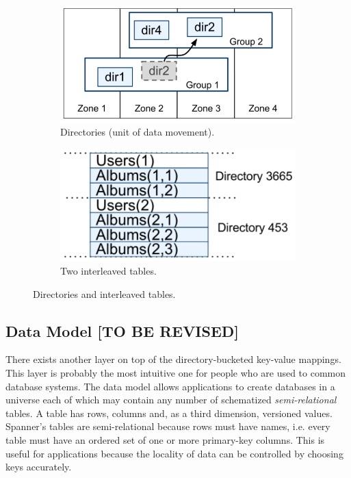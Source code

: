 \documentclass[onecolumn, a4paper, 10pt]{article}
\newcommand{\tbr}{{\color{red}\textbf{[TO BE REVISED]}}}
\begin{document}
\begin{figure}[ht]
  \centering
  \begin{subfigure}{0.45\textwidth}
    \includegraphics[width = \textwidth]{figs/directories}
    \caption{Directories (unit of data movement).~\cite{Corbett:2012}}
    \label{subfig:directories}
  \end{subfigure}
  \qquad
  \begin{subfigure}{0.45\textwidth}
    \includegraphics[width = \textwidth]{figs/interleaving-example.png}
    \caption{Two interleaved tables.~\cite{Corbett:2012}}
    \label{subfig:interleaved-tables}
  \end{subfigure}
  \caption{Directories and interleaved tables.}
  \label{fig:directories-and-tables}
\end{figure}

\subsection{Data Model \tbr}
\label{subsec:data-model}

There exists another layer on top of the directory-bucketed key-value mappings.
This layer is probably the most intuitive one for people who are used to common
database systems. The data model allows applications to create databases in a
universe each of which may contain any number of schematized
\emph{semi-relational} tables. A table has rows, columns and, as a third
dimension, versioned values. Spanner's tables are semi-relational because rows
must have names, i.e. every table must have an ordered set of one or more
primary-key columns. This is useful for applications because the locality of
data can be controlled by choosing keys accurately.
\end{document}
